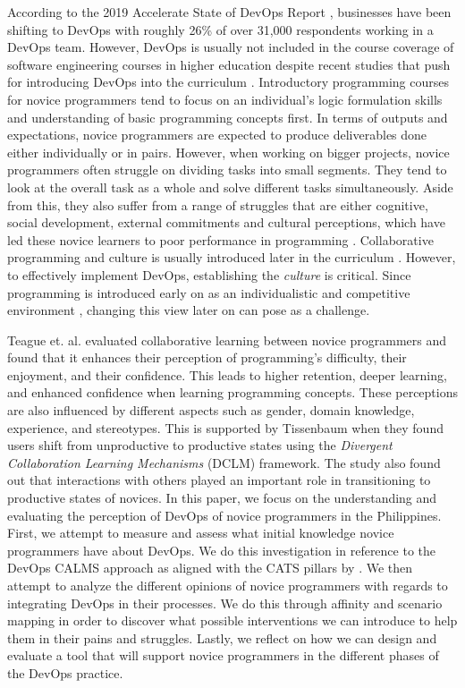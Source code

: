 \documentclass{sigchi}
\begin{document}
According to the 2019 Accelerate State of DevOps Report \cite{forsgren_smith_humble_frazelle_2019}, businesses have been shifting to DevOps with roughly 26\% of over 31,000 respondents working in a DevOps team. However, DevOps is usually not included in the course coverage of software engineering courses in higher education \cite{bass2016software} despite recent studies that push for introducing DevOps into the curriculum \cite{bruel2019software, jones2018proposal}. Introductory programming courses for novice programmers tend to focus on an individual's logic formulation skills and understanding of basic programming concepts first. In terms of outputs and expectations, novice programmers are expected to produce deliverables done either individually or in pairs. However, when working on bigger projects, novice programmers often struggle on dividing tasks into small segments. They tend to look at the overall task as a whole and solve different tasks simultaneously. Aside from this, they also suffer from a range of struggles that are either cognitive, social development, external commitments and cultural perceptions, which have led these novice learners to poor performance in programming \cite{teague2008collaborative}. Collaborative programming and culture is usually introduced later in the curriculum \cite{bass2016software}. However, to effectively implement DevOps, establishing the \textit{culture} is critical. Since programming is introduced early on as an individualistic and competitive environment \cite{teague2014longitudinal}, changing this view later on can pose as a challenge.

Teague et. al. \cite{teague2008collaborative} evaluated collaborative learning between novice programmers and found that it enhances their perception of programming's difficulty, their enjoyment, and their confidence. This leads to higher retention, deeper learning, and enhanced confidence when learning programming concepts. These perceptions are also influenced by different aspects such as gender, domain knowledge, experience, and stereotypes. This is supported by Tissenbaum \cite{tissenbaum2020see} when they found users shift from unproductive to productive states using the \textit{Divergent Collaboration Learning Mechanisms} (DCLM) framework. The study also found out that interactions with others played an important role in transitioning to productive states of novices. In this paper, we focus on the understanding and evaluating the perception of DevOps of novice programmers in the Philippines. First, we attempt to measure and assess what initial knowledge novice programmers have about DevOps. We do this investigation in reference to the DevOps CALMS approach \cite{hamunen2016challenges, riley2014keep} as aligned with the CATS pillars by \cite{davis2016effective}. We then attempt to analyze the different opinions of novice programmers with regards to integrating DevOps in their processes. We do this through affinity and scenario mapping in order to discover what possible interventions we can introduce to help them in their pains and struggles. Lastly, we reflect on how we can design and evaluate a tool that will support novice programmers in the different phases of the DevOps practice. 
\end{document}

